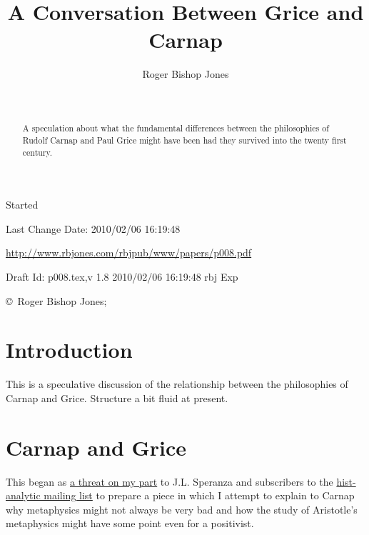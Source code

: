 \documentclass{article}
\title{A Conversation Between Grice and Carnap}
\author{Roger Bishop Jones}
\date{\ }
\begin{document}
                               
\begin{titlepage}
\maketitle
\begin{abstract}
A speculation about what the fundamental differences between the philosophies of Rudolf Carnap and Paul Grice might have been had they survived into the twenty first century.
\end{abstract}

\vfill

\begin{centering}

\vfill

\footnotesize{
Started 

Last Change $ $Date: 2010/02/06 16:19:48 $ $

\href{http://www.rbjones.com/rbjpub/www/papers/p008.pdf}{http://www.rbjones.com/rbjpub/www/papers/p008.pdf}

Draft $ $Id: p008.tex,v 1.8 2010/02/06 16:19:48 rbj Exp $ $

\copyright\ Roger Bishop Jones;

}%
\end{centering}

\end{titlepage}

\newpage
\setcounter{tocdepth}{4}
{\parskip-0pt\tableofcontents}

\section{Introduction}

This is a speculative discussion of the relationship between the philosophies of Carnap and Grice.
Structure a bit fluid at present.

\section{Carnap and Grice}\label{CARNAPANDGRICE}

This began as \href{http://rbjones.com/pipermail/hist-analytic_rbjones.com/2009q2/000267.html}{a threat on my part} to J.L. Speranza and subscribers to the \href{http://www.hist-analytic.org/}{hist-analytic mailing list} to prepare a piece in which I attempt to explain to Carnap why metaphysics might not always be very bad and how the study of Aristotle's metaphysics might have some point even for a positivist.
\end{document}
